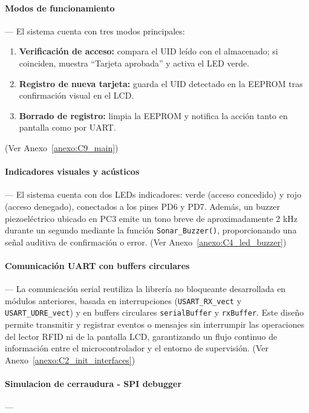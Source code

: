 \paragraph*{\textbf{Modos de funcionamiento}}---
El sistema cuenta con tres modos principales:
\begin{enumerate}
    \item \textbf{Verificación de acceso:} compara el UID leído con el almacenado; si coinciden, muestra “Tarjeta aprobada” y activa el LED verde.
    \item \textbf{Registro de nueva tarjeta:} guarda el UID detectado en la EEPROM tras confirmación visual en el LCD.
    \item \textbf{Borrado de registro:} limpia la EEPROM y notifica la acción tanto en pantalla como por UART.
\end{enumerate}
(Ver Anexo~\ref{anexo:C9_main})

\vspace{1em}

\paragraph*{\textbf{Indicadores visuales y acústicos}}---
El sistema cuenta con dos LEDs indicadores: verde (acceso concedido) y rojo (acceso denegado), conectados a los pines PD6 y PD7. Además, un buzzer piezoeléctrico ubicado en PC3 emite un tono breve de aproximadamente 2 kHz durante un segundo mediante la función \texttt{Sonar\_Buzzer()}, proporcionando una señal auditiva de confirmación o error. (Ver Anexo~\ref{anexo:C4_led_buzzer})

\vspace{1em}

\paragraph*{\textbf{Comunicación UART con buffers circulares}}---
La comunicación serial reutiliza la librería no bloqueante desarrollada en módulos anteriores, basada en interrupciones (\texttt{USART\_RX\_vect} y \texttt{USART\_UDRE\_vect}) y en buffers circulares \texttt{serialBuffer} y \texttt{rxBuffer}. Este diseño permite transmitir y registrar eventos o mensajes sin interrumpir las operaciones del lector RFID ni de la pantalla LCD, garantizando un flujo continuo de información entre el microcontrolador y el entorno de supervisión. (Ver Anexo~\ref{anexo:C2_init_interfaces})


\paragraph*{\textbf{Simulacion de cerraudura - SPI debugger}}---


